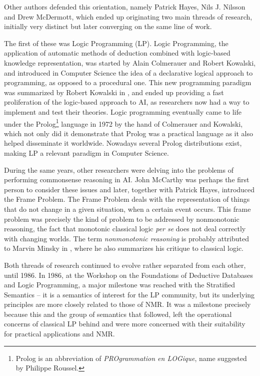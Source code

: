 Other authors defended this orientation, namely Patrick Hayes\cite{philoProblems}, Nils J. Nilsson\cite{logicAI} and Drew McDermott\cite{critique}, which ended up originating two main threads of research, initially very distinct but later converging on the same line of work.

The first of these was Logic Programming (LP). Logic Programming, the application of automatic methods of deduction combined with logic-based knowledge representation, was started by Alain Colmerauer \cite{prologReport} and Robert Kowalski\cite{logicAlgorithmControl,kowalskiPredicate}, and introduced in Computer Science the idea of a declarative logical approach to programming, as opposed to a procedural one. This new programming paradigm was summarized by Robert Kowalski in \cite{logicAlgorithmControl}, and ended up providing a fast proliferation of the logic-based approach to AI, as researchers now had a way to implement and test their theories. Logic programming eventually came to life under the Prolog\footnote{Prolog is an abbreviation of \emph{PROgrammation en LOGique}, name suggested by Philippe Roussel\cite{birthProlog}.} language in 1972 by the hand of Colmerauer and Kowalski, which not only did it demonstrate that Prolog was a practical language as it also helped disseminate it worldwide. Nowadays several Prolog distributions exist, making LP a relevant paradigm in Computer Science.

During the same years, other researchers were delving into the problems of performing commonsense reasoning in AI. John McCarthy was perhaps the first person to consider these issues\cite{commonSense} and later, together with Patrick Hayes\cite{philoProblems}, introduced the Frame Problem. The Frame Problem deals with the representation of things that do not change in a given situation, when a certain event occurs. This frame problem was precisely the kind of problem to be addressed by nonmonotonic reasoning, the fact that monotonic classical logic \emph{per se} does not deal correctly with changing worlds. The term \emph{nonmonotonic reasoning} is probably attributed to Marvin Minsky in \cite{nmrTermIntroduction}, where he also summarizes his critique to classical logic. 

Both threads of research continued to evolve rather separated from each other, until 1986. In 1986, at the Workshop on the Foundations of Deductive Databases and Logic Programming, a major milestone was reached with the Stratified Semantics -- it is a semantics of interest for the LP community, but its underlying principles are more closely related to those of NMR. It was a milestone precisely because this and the group of semantics that followed, left the operational concerns of classical LP behind and were more concerned with their suitability for practical applications and NMR. 

